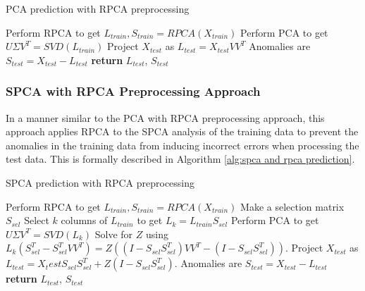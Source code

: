 \documentclass[conference]{IEEEtran}
\begin{document}
\begin{algorithm}
\caption{PCA prediction with RPCA preprocessing}\label{alg:pca and rpca prediction}
\begin{algorithmic}[1]
\State Perform RPCA to get $L_{train}, S_{train} = RPCA(X_{train})$
\State Perform PCA to get $U \Sigma V^T = SVD(L_{train})$
\State Project $X_{test}$ as $L_{test} = X_{test} V V^T$
\State Anomalies are $S_{test} = X_{test} - L_{test}$
\State \textbf{return} $L_{test}$, $S_{test}$
\EndProcedure
\end{algorithmic}
\end{algorithm}
\subsubsection{SPCA with RPCA Preprocessing Approach}
In a manner similar to the  PCA with RPCA preprocessing approach, this approach applies RPCA to the SPCA analysis of the training data to prevent the anomalies in the training data from inducing incorrect errors when processing the test data.  This is formally described in Algorithm \ref {alg:spca and rpca prediction}.

\begin{algorithm}
\caption{SPCA prediction with RPCA preprocessing}\label{alg:spca and rpca prediction}
\begin{algorithmic}[1]
\State Perform RPCA to get $L_{train}, S_{train} = RPCA(X_{train})$
\State Make a selection matrix $S_{sel}$
\State Select $k$ columns of $L_{train}$ to get $L_k = L_{train} S_{sel}$
\State Perform PCA to get $U \Sigma V^T = SVD(L_k)$
\State Solve for $Z$ using $L_k (S_{sel}^T - S_{sel}^T V V^T) = Z ((I-S_{sel} S_{sel}^T)V V^T - (I-S_{sel} S_{sel}^T))$.
\State Project $X_{test}$ as $L_{test} = X_test S_{sel} S_{sel}^T + Z (I-S_{sel} S_{sel}^T)$.
\State Anomalies are $S_{test} = X_{test} - L_{test}$
\State \textbf{return} $L_{test}$, $S_{test}$
\EndProcedure
\end{algorithmic}
\end{algorithm}
\end{document}
